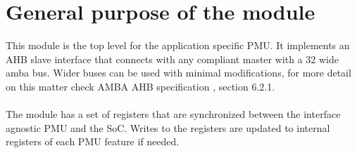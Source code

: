 \newpage
\section{General purpose of the module}
This module is the top level for the application specific PMU. 
It implements an AHB slave interface that connects with any compliant master with a 32 wide amba bus.
Wider buses can be used with minimal modifications, for more detail on this matter check AMBA AHB specification \cite{TODO}, section 6.2.1.\\
\\
The module has a set of registers that are synchronized between the interface agnostic PMU and the SoC. Writes to the registers are updated to internal registers of each PMU feature if needed.